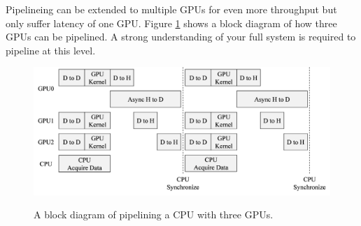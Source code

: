 Pipelineing can be extended to multiple GPUs for even more throughput but only suffer latency of one GPU.
Figure \ref{fig:concurrentCPU_nonBlocking_multiGPU} shows a block diagram of how three GPUs can be pipelined.
A strong understanding of your full system is required to pipeline at this level.
\begin{figure}
	\caption{A block diagram of pipelining a CPU with three GPUs.}
	\centering\includegraphics[width=11.42in/100*55]{figures/gpu_intro/concurrentCPU_nonBlocking_multiGPU.pdf}
	\label{fig:concurrentCPU_nonBlocking_multiGPU}
\end{figure}